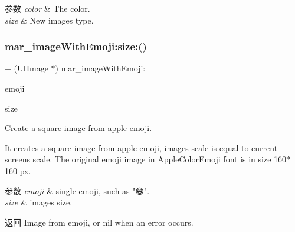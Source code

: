 \begin{DoxyParams}{参数}
{\em color} & The color. \\
\hline
{\em size} & New image\textquotesingle{}s type. \\
\hline
\end{DoxyParams}
\mbox{\label{category_u_i_image_07_m_a_r_e_x_08_a36768c8ad1f1c2990bbb0414cf407f76}} 
\subsubsection{\texorpdfstring{mar\+\_\+image\+With\+Emoji\+:size\+:()}{mar\_imageWithEmoji:size:()}}
{\footnotesize\ttfamily + (U\+I\+Image $\ast$) mar\+\_\+image\+With\+Emoji\+: \begin{DoxyParamCaption}\item[{(N\+S\+String $\ast$)}]{emoji }\item[{size:(C\+G\+Float)}]{size }\end{DoxyParamCaption}}

Create a square image from apple emoji.

It creates a square image from apple emoji, image\textquotesingle{}s scale is equal to current screen\textquotesingle{}s scale. The original emoji image in {\ttfamily Apple\+Color\+Emoji} font is in size 160$\ast$160 px.


\begin{DoxyParams}{参数}
{\em emoji} & single emoji, such as "😄".\\
\hline
{\em size} & image\textquotesingle{}s size.\\
\hline
\end{DoxyParams}
\begin{DoxyReturn}{返回}
Image from emoji, or nil when an error occurs. 
\end{DoxyReturn}
\mbox{\label{category_u_i_image_07_m_a_r_e_x_08_a34a99e3b432978039bfcfdb05a34cfef}} 
